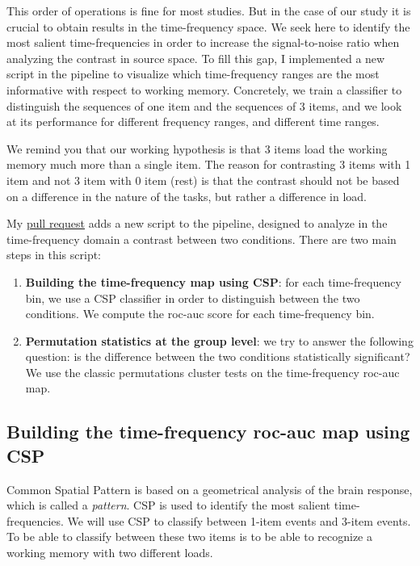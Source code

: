 This order of operations is fine for most studies. But in the case of our study it is crucial to obtain results in the time-frequency space. We seek here to identify the most salient time-frequencies in order to increase the signal-to-noise ratio when analyzing the contrast in source space. To fill this gap, I implemented a new script in the pipeline to visualize which time-frequency ranges are the most informative with respect to working memory. Concretely, we train a classifier to distinguish the sequences of one item and the sequences of 3 items, and we look at its performance for different frequency ranges, and different time ranges.

We remind you that our working hypothesis is that 3 items load the working memory much more than a single item. The reason for contrasting 3 items with 1 item and not 3 item with 0 item (rest) is that the contrast should not be based on a difference in the nature of the tasks, but rather a difference in load.

My \href{https://github.com/mne-tools/mne-bids-pipeline/pull/414}{pull request} adds a new script to the pipeline, designed to analyze in the time-frequency domain a contrast between two conditions. There are two main steps in this script:
\begin{enumerate}
    \item \textbf{Building the time-frequency map using CSP}: for each time-frequency bin, we use a CSP classifier in order to distinguish between the two conditions. We compute the roc-auc score for each time-frequency bin.
    \item \textbf{Permutation statistics at the group level}: we try to answer the following question: is the difference between the two conditions statistically significant? We use the classic permutations cluster tests on the time-frequency roc-auc map.
\end{enumerate}

\subsection{Building the time-frequency roc-auc map using CSP}

Common Spatial Pattern is based on a geometrical analysis of the brain response, which is called a \textit{pattern}. CSP is used to identify the most salient time-frequencies. We will use CSP to classify between 1-item events and 3-item events. To be able to classify between these two items is to be able to recognize a working memory with two different loads.

